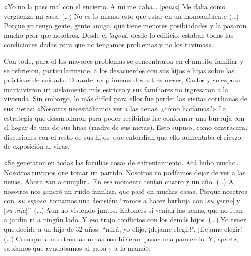 \begin{refsection}
\begin{gbcita}
«Yo no la pasé mal con el encierro. A mí me daba… [\emph{pausa}] Me daba como vergüenza mi casa. (…) No es lo mismo esto que estar en un monoambiente (…) Porque yo tengo gente, gente amiga, que tiene menores posibilidades y la pasaron mucho peor que nosotros. Desde el \emph{layout}, desde lo edilicio, estaban todas las condiciones dadas para que no tengamos problemas y no los tuvimos».

\end{gbcita}

Con todo, para él los mayores problemas se concentraron en el ámbito familiar y se refirieron, particularmente, a los desacuerdos con sus hijos e hijas sobre las prácticas de cuidado. Durante los primeros dos a tres meses, Carlos y su esposa mantuvieron un aislamiento más estricto y sus familiares no ingresaron a la vivienda. Sin embargo, lo más difícil para ellos fue perder las visitas cotidianas de sus nietas: «Nosotros necesitábamos ver a las nenas, ¿cómo hacíamos?» La estrategia que desarrollaron para poder recibirlas fue conformar una burbuja con el hogar de una de sus hijas (madre de sus nietas). Esto supuso, como contracara, discusiones con el resto de sus hijos, que entendían que ello aumentaba el riesgo de exposición al virus.


\begin{gbcita}
«Se generaron en todas las familias cosas de enfrentamiento. Acá hubo mucho… Nosotros tuvimos que tomar un partido. Nosotros no podíamos dejar de ver a las nenas. Ahora van a cumplir… En ese momento tenían cuatro y un año. (…) A nosotros nos generó un ruido familiar, que pasó en muchas casas. Porque nosotros con [\emph{su esposa}] tomamos una decisión: “vamos a hacer burbuja con [\emph{su yerno}] y [\emph{su hija}]”. (…) Aun no viviendo juntos. Entonces sí venían las nenas, que no iban a jardín ni a ningún lado. Y eso trajo conflictos con los demás hijos. (…) Yo tener que decirle a un hijo de 32 años: “mirá, yo elijo, ¡dejame elegir!”. ¡Dejame elegir! (…) Creo que a nosotros las nenas nos hicieron pasar una pandemia. Y, aparte, sabíamos que ayudábamos al papá y a la mamá».

\end{gbcita}


\end{refsection}
